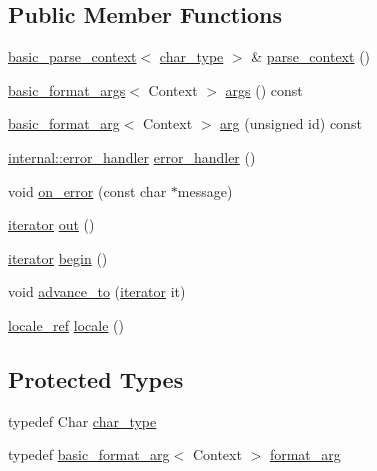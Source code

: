 \subsection*{Public Member Functions}
\begin{DoxyCompactItemize}
\item 
\hyperlink{classbasic__parse__context}{basic\+\_\+parse\+\_\+context}$<$ \hyperlink{classinternal_1_1context__base_a012818dce2cbba8d267491288b9f3f63}{char\+\_\+type} $>$ \& \hyperlink{classinternal_1_1context__base_a8b2dea2761b5bd19dfe60435a68f80d6}{parse\+\_\+context} ()
\item 
\hyperlink{classbasic__format__args}{basic\+\_\+format\+\_\+args}$<$ Context $>$ \hyperlink{classinternal_1_1context__base_a2dffc62b4cf30e9a359c1c85827c8c43}{args} () const
\item 
\hyperlink{classbasic__format__arg}{basic\+\_\+format\+\_\+arg}$<$ Context $>$ \hyperlink{classinternal_1_1context__base_a87e06ec53f13930b9e1fb1e3e6762632}{arg} (unsigned id) const
\item 
\hyperlink{structinternal_1_1error__handler}{internal\+::error\+\_\+handler} \hyperlink{classinternal_1_1context__base_a75d451a0b31787d6e482e7b8c8886f45}{error\+\_\+handler} ()
\item 
void \hyperlink{classinternal_1_1context__base_a79b1e03aabedc2e157b34cc7adadf451}{on\+\_\+error} (const char $\ast$message)
\item 
\hyperlink{classinternal_1_1context__base_a6486e3c9656c10eb99a4731fb169e51b}{iterator} \hyperlink{classinternal_1_1context__base_ab77c1d5e2cf72ef323e1599be8567fee}{out} ()
\item 
\hyperlink{classinternal_1_1context__base_a6486e3c9656c10eb99a4731fb169e51b}{iterator} \hyperlink{classinternal_1_1context__base_a9de5734a58ca81e3fadf0a01c78acfa5}{begin} ()
\item 
void \hyperlink{classinternal_1_1context__base_a9b9ce1c9b8d586251ab40312840779c9}{advance\+\_\+to} (\hyperlink{classinternal_1_1context__base_a6486e3c9656c10eb99a4731fb169e51b}{iterator} it)
\item 
\hyperlink{classinternal_1_1locale__ref}{locale\+\_\+ref} \hyperlink{classinternal_1_1context__base_aa60dff208558ea95aadc2cc20af382ce}{locale} ()
\end{DoxyCompactItemize}
\subsection*{Protected Types}
\begin{DoxyCompactItemize}
\item 
typedef Char \hyperlink{classinternal_1_1context__base_a012818dce2cbba8d267491288b9f3f63}{char\+\_\+type}
\item 
typedef \hyperlink{classbasic__format__arg}{basic\+\_\+format\+\_\+arg}$<$ Context $>$ \hyperlink{classinternal_1_1context__base_aa0c806d3176db7f4c5e5a0fa08561102}{format\+\_\+arg}
\end{DoxyCompactItemize}
